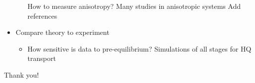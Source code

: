\documentclass[aspectratio=169,11pt,usenames,dvipsnames]{beamer}
\begin{document}
\begin{frame}
\begin{itemize}
\begin{itemize}
                    {\scriptsize\color{lightgray}How to measure anisotropy? Many studies in anisotropic systems {\color{jyured}Add references}}
                \end{itemize}
                \item  {\large{Compare theory to experiment}}
                \begin{itemize}
                    \item[\raisebox{0.2em}{\scalebox{0.6}{${\color{jyured}\blacktriangleright}$}}] {\scriptsize\color{lightgray} How sensitive is data to pre-equilibrium? Simulations of all stages for HQ transport
                    }
                \end{itemize}
        \end{itemize} 
\end{frame}

\appendix

\begin{frame}{}
    \vspace{20pt}
    \huge\centering Thank you!
\end{frame}
\end{document}
